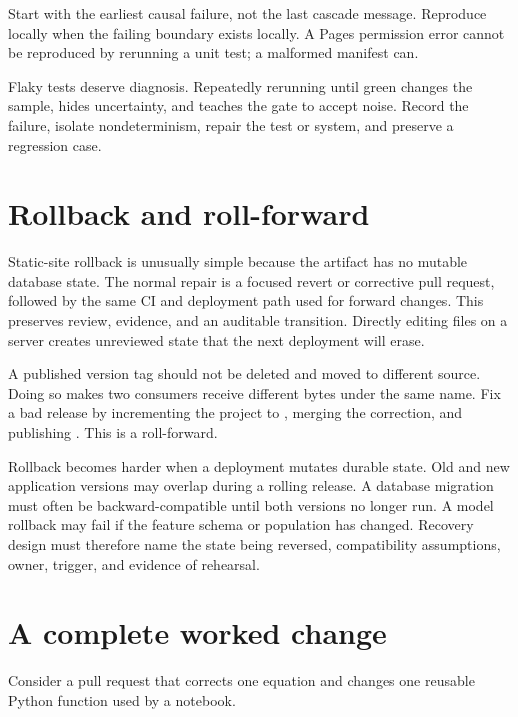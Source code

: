 Start with the earliest causal failure, not the last cascade message. Reproduce
locally when the failing boundary exists locally. A Pages permission error
cannot be reproduced by rerunning a unit test; a malformed manifest can.

Flaky tests deserve diagnosis. Repeatedly rerunning until green changes the
sample, hides uncertainty, and teaches the gate to accept noise. Record the
failure, isolate nondeterminism, repair the test or system, and preserve a
regression case.

\section{Rollback and roll-forward}

Static-site rollback is unusually simple because the artifact has no mutable
database state. The normal repair is a focused revert or corrective pull
request, followed by the same CI and deployment path used for forward changes.
This preserves review, evidence, and an auditable transition. Directly editing
files on a server creates unreviewed state that the next deployment will erase.

A published version tag should not be deleted and moved to different source.
Doing so makes two consumers receive different bytes under the same name. Fix a
bad  release by incrementing the project to
, merging the correction, and publishing
. This is a roll-forward.

Rollback becomes harder when a deployment mutates durable state. Old and new
application versions may overlap during a rolling release. A database migration
must often be backward-compatible until both versions no longer run. A model
rollback may fail if the feature schema or population has changed. Recovery
design must therefore name the state being reversed, compatibility assumptions,
owner, trigger, and evidence of rehearsal.

\section{A complete worked change}

Consider a pull request that corrects one equation and changes one reusable
Python function used by a notebook.

